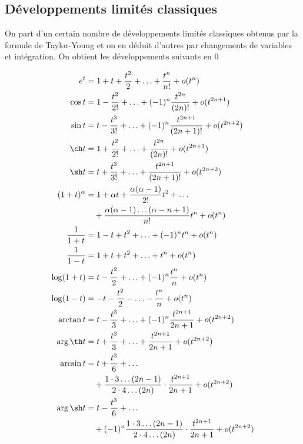 \subsection{Développements limités classiques}

On part d'un certain nombre de développements limités classiques obtenus par la formule de Taylor-Young et on en déduit d'autres par changements de variables et intégration. On obtient les développements suivants en 0

\begin{align*}
e^t &= 1 + t + \frac{t^2}{2} + \ldots + \frac{t^n}{n!} + o(t^n) \\
\cos t &= 1 - \frac{t^2}{2!} + \ldots + (-1)^n \frac{t^{2n}}{(2n)!} + o(t^{2n+1}) \\
\sin t &= t - \frac{t^3}{3!} + \ldots + (-1)^n \frac{t^{2n+1}}{(2n + 1)!} + o(t^{2n+2}) \\
\ch t &= 1 + \frac{t^2}{2!} + \ldots + \frac{t^{2n}}{(2n)!} + o(t^{2n+1}) \\
\sh t &= t + \frac{t^3}{3!} +\ldots + \frac{t^{2n+1}}{(2n + 1)!} + o(t^{2n+2}) \\
(1 + t)^{\alpha} &= 1 + \alpha t + \frac{\alpha(\alpha - 1)}{2!} t^2 + \ldots \\
&\quad + \frac{\alpha(\alpha - 1)\ldots(\alpha - n + 1)}{n!} t^n + o(t^n) \\
\frac{1}{1 + t} &= 1 - t + t^2 + \ldots + (-1)^n t^n + o(t^n) \\
\frac{1}{1 - t} &= 1 + t + t^2 + \ldots + t^n + o(t^n) \\
\log (1 + t) &= t - \frac{t^2}{2} + \ldots + (-1)^n \frac{t^n}{n} + o(t^n) \\
\log (1 - t) &= -t - \frac{t^2}{2} - \ldots - \frac{t^n}{n} + o(t^n) \\
\arctan t &= t - \frac{t^3}{3} + \ldots + (-1)^n \frac{t^{2n+1}}{2n + 1} + o(t^{2n+2}) \\
\arg \th t &= t + \frac{t^3}{3} + \ldots + \frac{t^{2n+1}}{2n + 1} + o(t^{2n+2}) \\
\arcsin t &= t + \frac{t^3}{6} + \ldots \\
&\quad + \frac{1 \cdot 3 \ldots (2n - 1)}{2 \cdot 4 \ldots (2n)} \cdot \frac{t^{2n+1}}{2n + 1} + o(t^{2n+2}) \\
\arg \sh t &= t - \frac{t^3}{6} + \ldots \\
&\quad + (-1)^n \frac{1 \cdot 3 \ldots (2n - 1)}{2 \cdot 4 \ldots (2n)} \cdot \frac{t^{2n+1}}{2n + 1} + o(t^{2n+2})
\end{align*}

